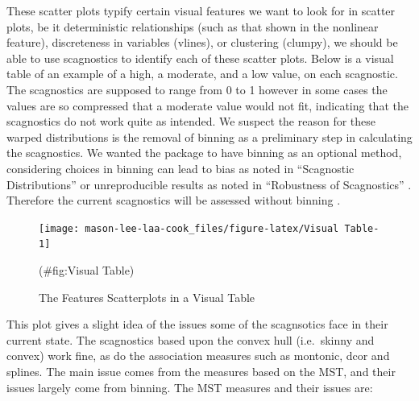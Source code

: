 These scatter plots typify certain visual features we want to look for
in scatter plots, be it deterministic relationships (such as that shown
in the nonlinear feature), discreteness in variables (vlines), or
clustering (clumpy), we should be able to use scagnostics to identify
each of these scatter plots. Below is a visual table of an example of a
high, a moderate, and a low value, on each scagnostic. The scagnostics
are supposed to range from 0 to 1 however in some cases the values are
so compressed that a moderate value would not fit, indicating that the
scagnostics do not work quite as intended. We suspect the reason for
these warped distributions is the removal of binning as a preliminary
step in calculating the scagnostics. We wanted the package to have
binning as an optional method, considering choices in binning can lead
to bias as noted in ``Scagnostic Distributions'' \citep{scagdist} or
unreproducible results as noted in ``Robustness of Scagnostics'' .
Therefore the current scagnostics will be assessed without binning
\citep{robust}.

\begin{Schunk}
\begin{figure}
\texttt{[image: mason-lee-laa-cook\_files/figure-latex/Visual Table-1]} \caption[The Features Scatterplots in a Visual Table]{The Features Scatterplots in a Visual Table}(\#fig:Visual Table)
\end{figure}
\end{Schunk}

This plot gives a slight idea of the issues some of the scagnsotics face
in their current state. The scagnostics based upon the convex hull
(i.e.~skinny and convex) work fine, as do the association measures such
as montonic, dcor and splines. The main issue comes from the measures
based on the MST, and their issues largely come from binning. The MST
measures and their issues are:

